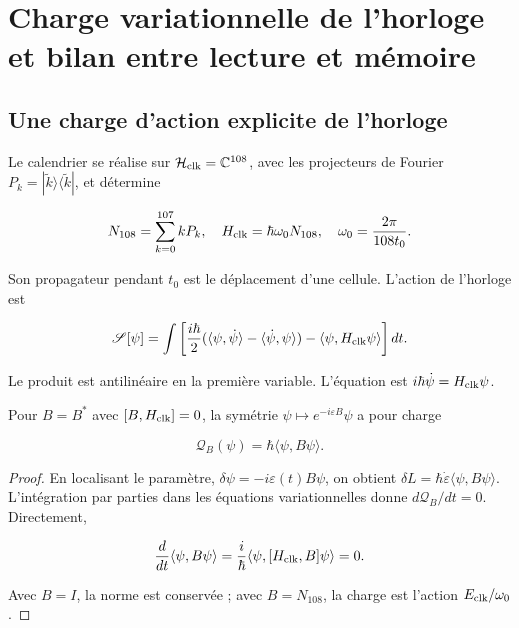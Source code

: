 \section{Charge variationnelle de l’horloge et bilan entre lecture et mémoire}

\subsection{Une charge d’action explicite de l’horloge}

Le calendrier se réalise sur \(\mathcal H_{\rm clk}=\mathbb C^{108}\), avec les projecteurs de Fourier \(P_k=|\widetilde k\rangle\langle\widetilde k|\), et détermine

\begin{equation}
N_{108}=\sum_{k=0}^{107}kP_k,\quad
H_{\rm clk}=\hbar\omega_0N_{108},\quad
\omega_0=\frac{2\pi}{108t_0}.
\label{x_reciprocidad:nuc07:eq:12}
\end{equation}

Son propagateur pendant \(t_0\) est le déplacement d’une cellule. L’action de l’horloge est

\begin{equation}
\mathscr S[\psi]=\int
\left[\frac{i\hbar}{2}
(\langle\psi,\dot\psi\rangle-\langle\dot\psi,\psi\rangle)
-\langle\psi,H_{\rm clk}\psi\rangle\right]dt.
\label{x_reciprocidad:nuc07:eq:13}
\end{equation}

Le produit est antilinéaire en la première variable. L’équation est \(i\hbar\dot\psi=H_{\rm clk}\psi\).

\begin{proposition}
Pour \(B=B^*\) avec \([B,H_{\rm clk}]=0\), la symétrie \(\psi\mapsto e^{-i\varepsilon B}\psi\) a pour charge

\begin{equation}
\mathcal Q_B(\psi)=\hbar\langle\psi,B\psi\rangle.
\label{x_reciprocidad:nuc07:eq:14}
\end{equation}
\end{proposition}

\begin{proof}
En localisant le paramètre, \(\delta\psi=-i\varepsilon(t)B\psi\), on obtient
\(\delta L=\hbar\dot\varepsilon\langle\psi,B\psi\rangle\).
L’intégration par parties dans les équations variationnelles donne \(d\mathcal Q_B/dt=0\). Directement,

\[
\frac{d}{dt}\langle\psi,B\psi\rangle
=\frac{i}{\hbar}\langle\psi,[H_{\rm clk},B]\psi\rangle=0.
\]

Avec \(B=I\), la norme est conservée ; avec \(B=N_{108}\), la charge est l’action \(E_{\rm clk}/\omega_0\).
\end{proof}

